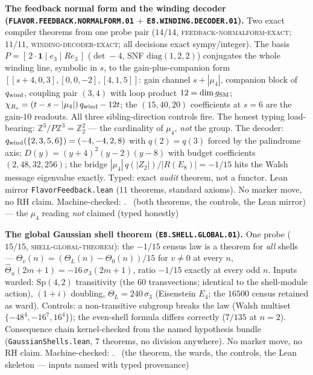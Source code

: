\documentclass[11pt,a4paper]{article}
\newcommand{\Z}{\mathbb{Z}}
\theoremstyle{definition}
\begin{document}
\par\smallskip\noindent\textbf{The feedback normal form and the
winding decoder
(\texttt{FLAVOR.FEEDBACK.\allowbreak NORMALFORM.01} $+$
\texttt{E8.WINDING.\allowbreak DECODER.01}).}
Two exact compiler theorems from one probe pair ($14/14$,
\textsc{feedback-normalform-exact}; $11/11$,
\textsc{winding-decoder-exact}; all decisions exact
sympy/integer).  The basis $P = [\,2\cdot\mathbf 1 \mid e_3 \mid
R e_3\,]$ ($\det -4$, SNF $\mathrm{diag}(1,2,2)$) conjugates the
whole winding line, symbolic in $s$, to the gain-plus-companion
form $[[s{+}4,0,3],[0,0,-2],[4,1,5]]$: gain channel $s +
|\mu_4|$, companion block of $q_{\rm wind}$, coupling pair
$(3,4)$ with loop product $12 = \dim g_{\rm SM}$; $\chi_{R_s} =
(t - s - |\mu_4|)\,q_{\rm wind} - 12t$; the $(15,40,20)$
coefficients at $s = 6$ are the gain-$10$ readouts.  All three
sibling-direction controls fire.  The honest typing
load-bearing: $\Z^3/P\Z^3 = \Z_2^2$ --- the cardinality of
$\mu_4$, \emph{not} the group.  The decoder: $q_{\rm
wind}(\{2,3,5,6\}) = (-4,-4,2,8)$ with $q(2) = q(3)$ forced by
the palindrome axis; $D(y) = (y{+}4)^2(y{-}2)(y{-}8)$ with
budget coefficients $(2, 48, 32, 256)$; the bridge
$|\mu_4|\,q(|Z_2|)/|R(E_8)| = -1/15$ hits the Walsh message
eigenvalue exactly.  Typed: exact \emph{audit} theorem, not a
functor.  Lean mirror \texttt{FlavorFeedback.lean} ($11$
theorems, standard axioms).  No marker move, no RH claim.
Machine-checked: .
\mE\ (both theorems, the controls, the Lean mirror) --- the
$\mu_4$ reading \emph{not} claimed (typed honestly)
\par\smallskip

\par\smallskip\noindent\textbf{The global Gaussian shell theorem
(\texttt{E8.SHELL.GLOBAL.01}).}
One probe ($15/15$, \textsc{shell-global-theorem}): the $-1/15$
census law is a theorem for \emph{all} shells --- $\Theta_v(n) =
(\Theta_L(n) - \Theta_0(n))/15$ for $v \ne 0$ at every $n$,
$\hat\Theta_u(2m{+}1) = -16\,\sigma_3(2m{+}1)$, ratio $-1/15$
exactly at every odd $n$.  Inputs warded: $\mathrm{Sp}(4,2)$
transitivity (the $60$ transvections; identical to the
shell-module action), $(1{+}i)$ doubling, $\Theta_L =
240\,\sigma_3$ (Eisenstein $E_4$; the $16500$ census retained as
ward).  Controls: a non-transitive subgroup breaks the law
(Walsh multiset $\{-48^4, -16^7, 16^4\}$); the even-shell
formula differs correctly ($7/135$ at $n = 2$).  Consequence
chain kernel-checked from the named hypothesis bundle
(\texttt{GaussianShells.lean}, $7$ theorems, no division
anywhere).  No marker move, no RH claim.
Machine-checked: .
\mE\ (the theorem, the wards, the controls, the Lean skeleton
--- inputs named with typed provenance)
\par\smallskip
\end{document}
